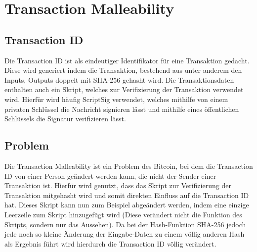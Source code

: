 
\section{Transaction Malleability}
\label{ch:TransactionMalleability}


\subsection{Transaction ID}
\label{sec:TransactionMalleability:TransactionID}
Die Transaction ID ist als eindeutiger Identifikator für eine Transaktion gedacht. Diese wird generiert indem die Transaktion, bestehend aus unter anderem den Inputs, Outputs doppelt mit SHA-256 gehasht wird. Die Transaktionsdaten enthalten auch ein Skript, welches zur Verifizierung der Transaktion verwendet wird. Hierfür wird häufig ScriptSig verwendet, welches mithilfe von einem privaten Schlüssel die Nachricht signieren lässt und mithilfe eines öffentlichen Schlüssels die Signatur verifizieren lässt.

\subsection{Problem}
\label{sec:TransactionMalleability:Problem}
Die Transaction Malleability ist ein Problem des Bitcoin, bei dem die Transaction ID von einer Person geändert werden kann, die nicht der Sender einer Transaktion ist. Hierfür wird genutzt, dass das Skript zur Verifizierung der Transaktion mitgehasht wird und somit direkten Einfluss auf die Transaction ID hat. Dieses Skript kann nun zum Beispiel abgeändert werden, indem eine einzige Leerzeile zum Skript hinzugefügt wird (Diese verändert nicht die Funktion des Skripts, sondern nur das Aussehen). Da bei der Hash-Funktion SHA-256 jedoch jede noch so kleine Änderung der Eingabe-Daten zu einem völlig anderen Hash als Ergebnis führt wird hierdurch die Transaction ID völlig verändert.

